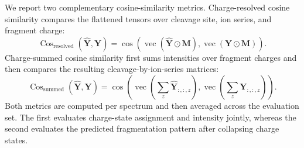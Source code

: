 We report two complementary cosine-similarity metrics. Charge-resolved cosine
similarity compares the flattened tensors over cleavage site, ion series, and
fragment charge:
\begin{equation}
    \operatorname{Cos}_{\mathrm{resolved}}(\widehat{\mathbf{Y}},\mathbf{Y})
    = \cos\!\left(\operatorname{vec}(\widehat{\mathbf{Y}}\odot\mathbf{M}),
                  \operatorname{vec}(\mathbf{Y}\odot\mathbf{M})\right).
\end{equation}
Charge-summed cosine similarity first sums intensities over fragment charges
and then compares the resulting cleavage-by-ion-series matrices:
\begin{equation}
    \operatorname{Cos}_{\mathrm{summed}}(\widehat{\mathbf{Y}},\mathbf{Y})
    = \cos\!\left(
        \operatorname{vec}\!\left(\sum_z\widehat{\mathbf{Y}}_{:,:,z}\right),
        \operatorname{vec}\!\left(\sum_z\mathbf{Y}_{:,:,z}\right)
      \right).
\end{equation}
Both metrics are computed per spectrum and then averaged across the evaluation
set. The first evaluates charge-state assignment and intensity jointly,
whereas the second evaluates the predicted fragmentation pattern after
collapsing charge states.
